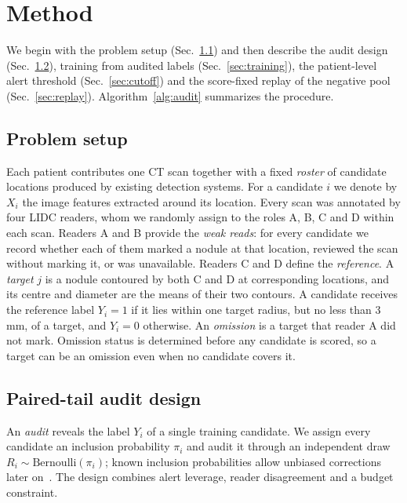 \section{Method}
\label{sec:methods}

We begin with the problem setup (Sec.~\ref{sec:setting}) and then describe the audit design (Sec.~\ref{sec:audit}), training from audited labels (Sec.~\ref{sec:training}), the patient-level alert threshold (Sec.~\ref{sec:cutoff}) and the score-fixed replay of the negative pool (Sec.~\ref{sec:replay}). Algorithm~\ref{alg:audit} summarizes the procedure.

\subsection{Problem setup}
\label{sec:setting}

Each patient contributes one CT scan together with a fixed \emph{roster} of candidate locations produced by existing detection systems. For a candidate $i$ we denote by $X_i$ the image features extracted around its location. Every scan was annotated by four LIDC readers, whom we randomly assign to the roles A, B, C and D within each scan. Readers A and B provide the \emph{weak reads}: for every candidate we record whether each of them marked a nodule at that location, reviewed the scan without marking it, or was unavailable. Readers C and D define the \emph{reference}. A \emph{target} $j$ is a nodule contoured by both C and D at corresponding locations, and its centre and diameter are the means of their two contours. A candidate receives the reference label $Y_i=1$ if it lies within one target radius, but no less than 3\,mm, of a target, and $Y_i=0$ otherwise. An \emph{omission} is a target that reader A did not mark. Omission status is determined before any candidate is scored, so a target can be an omission even when no candidate covers it.

\subsection{Paired-tail audit design}
\label{sec:audit}

An \emph{audit} reveals the label $Y_i$ of a single training candidate. We assign every candidate an inclusion probability $\pi_i$ and audit it through an independent draw $R_i\sim\mathrm{Bernoulli}(\pi_i)$; known inclusion probabilities allow unbiased corrections later on~\cite{horvitz1952}. The design combines alert leverage, reader disagreement and a budget constraint.


